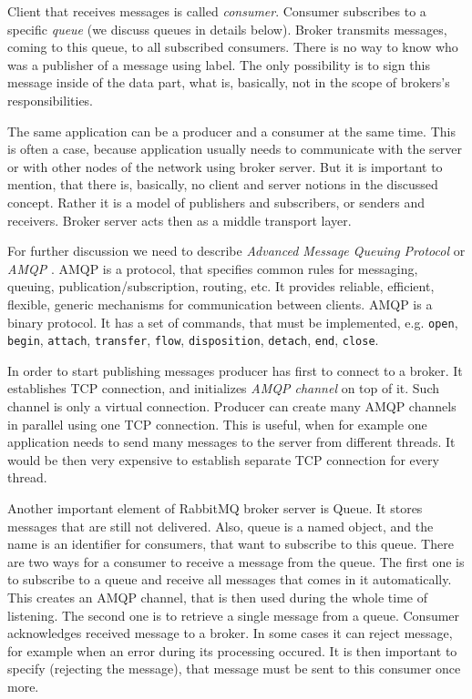 Client that receives messages is called \textit{consumer}.
Consumer subscribes to a specific \textit{queue} (we discuss queues in details below).
Broker transmits messages, coming to this queue, to all subscribed consumers.
There is no way to know who was a publisher of a message using label.
The only possibility is to sign this message inside of the data part, what is, basically, not in the scope of brokers's responsibilities.

The same application can be a producer and a consumer at the same time.
This is often a case, because application usually needs to communicate with the server or with other nodes of the network using broker server.
But it is important to mention, that there is, basically, no client and server notions in the discussed concept.
Rather it is a model of publishers and subscribers, or senders and receivers.
Broker server acts then as a middle transport layer.

For further discussion we need to describe \textit{Advanced Message Queuing Protocol}  or \textit{AMQP} \cite{AMQP2011}.
AMQP is a protocol, that specifies common rules for messaging, queuing, publication/subscription, routing, etc.
It provides reliable, efficient, flexible, generic mechanisms for communication between clients.
AMQP is a binary protocol.
It has a set of commands, that must be implemented, e.g. \lstinline{open}, \lstinline{begin}, \lstinline{attach}, \lstinline{transfer}, \lstinline{flow}, \lstinline{disposition}, \lstinline{detach}, \lstinline{end}, \lstinline{close}.

In order to start publishing messages producer has first to connect to a broker.
It establishes TCP connection, and initializes \textit{AMQP channel}  on top of it.
Such channel is only a virtual connection.
Producer can create many AMQP channels in parallel using one TCP connection.
This is useful, when for example one application needs to send many messages to the server from different threads.
It would be then very expensive to establish separate TCP connection for every thread.

Another important element of RabbitMQ broker server is Queue.
It stores messages that are still not delivered.
Also, queue is a named object, and the name is an identifier for consumers, that want to subscribe to this queue.
There are two ways for a consumer to receive a message from the queue.
The first one is to subscribe to a queue and receive all messages that comes in it automatically.
This creates an AMQP channel, that is then used during the whole time of listening.
The second one is to retrieve a single message from a queue.
Consumer acknowledges received message to a broker.
In some cases it can reject message, for example when an error during its processing occured.
It is then important to specify (rejecting the message), that message must be sent to this consumer once more.


